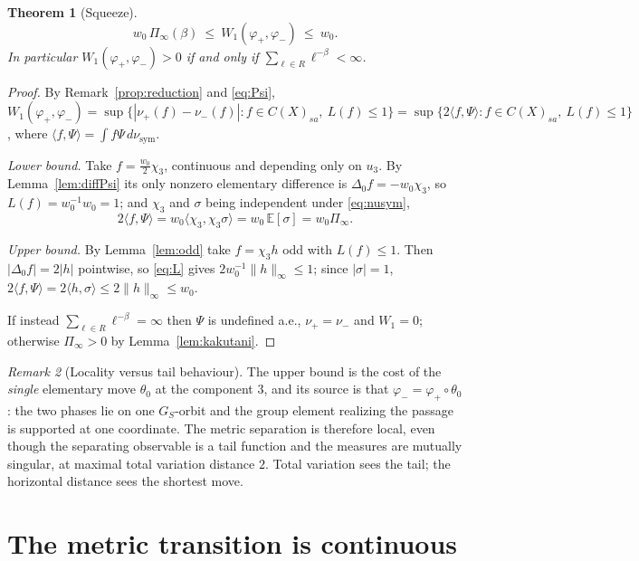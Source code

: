 \documentclass[11pt]{amsart}
\numberwithin{equation}{section}
\newtheorem{theorem}{Theorem}[section]
\theoremstyle{definition}
\theoremstyle{remark}
\newtheorem{remark}[theorem]{Remark}
\newcommand{\nusym}{\nu_{\mathrm{sym}}}
\begin{document}
\begin{theorem}[Squeeze]\label{thm:squeeze}
\begin{equation}\label{eq:squeeze}
w_0\,\Pi_\infty(\beta)\ \le\ W_1(\varphi_+,\varphi_-)\ \le\ w_0 .
\end{equation}
In particular $W_1(\varphi_+,\varphi_-)>0$ if and only if
$\sum_{\ell\in R}\ell^{-\beta}<\infty$.
\end{theorem}

\begin{proof}
By Remark~\ref{prop:reduction} and \eqref{eq:Psi},
$W_1(\varphi_+,\varphi_-)=\sup\{|\nu_+(f)-\nu_-(f)|:f\in C(X)_{sa},\ L(f)\le1\}
=\sup\{2\langle f,\Psi\rangle:f\in C(X)_{sa},\ L(f)\le1\}$, where
$\langle f,\Psi\rangle=\int f\Psi\,d\nusym$.

\emph{Lower bound.} Take $f=\tfrac{w_0}{2}\chi_3$, continuous and depending only on $u_3$. By
Lemma~\ref{lem:diffPsi} its only nonzero elementary difference is $\Delta_0f=-w_0\chi_3$, so
$L(f)=w_0^{-1}w_0=1$; and $\chi_3$ and $\sigma$ being independent under \eqref{eq:nusym},
\[
2\langle f,\Psi\rangle=w_0\langle\chi_3,\chi_3\sigma\rangle=w_0\,\mathbb E[\sigma]=w_0\Pi_\infty .
\]

\emph{Upper bound.} By Lemma~\ref{lem:odd} take $f=\chi_3h$ odd with $L(f)\le1$. Then
$|\Delta_0f|=2|h|$ pointwise, so \eqref{eq:L} gives $2w_0^{-1}\|h\|_\infty\le1$; since
$|\sigma|=1$,
$2\langle f,\Psi\rangle=2\langle h,\sigma\rangle\le2\|h\|_\infty\le w_0$.

If instead $\sum_{\ell\in R}\ell^{-\beta}=\infty$ then $\Psi$ is undefined a.e.,
$\nu_+=\nu_-$ and $W_1=0$; otherwise $\Pi_\infty>0$ by Lemma~\ref{lem:kakutani}.
\end{proof}

\begin{remark}[Locality versus tail behaviour]\label{rem:locality}
The upper bound is the cost of the \emph{single} elementary move $\theta_0$ at the component
$3$, and its source is that $\varphi_-=\varphi_+\circ\theta_0$: the two phases lie on one
$G_S$-orbit and the group element realizing the passage is supported at one coordinate. The
metric separation is therefore local, even though the separating observable is a tail
function and the measures are mutually singular, at maximal total variation distance $2$.
Total variation sees the tail; the horizontal distance sees the shortest move.
\end{remark}

\section{The metric transition is continuous}
\end{document}

